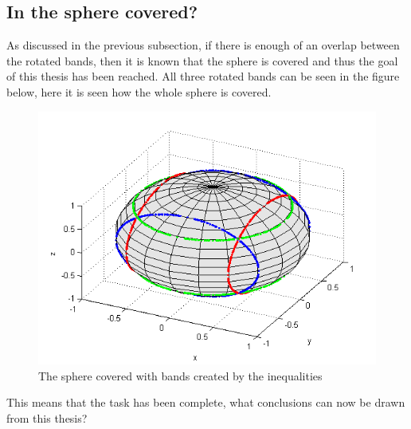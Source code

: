\subsection{In the sphere covered?}\label{Is the sphere covered?}
As discussed in the previous subsection, if there is enough of an overlap between the rotated bands, then it is known that the sphere is covered and thus the goal of this thesis has been reached.
All three rotated bands can be seen in the figure below, here it is seen how the whole sphere is covered.
\begin{figure}[H]
\begin{center}
\includegraphics[scale=0.9]{coveredsphere.png}
\caption{The sphere covered with bands created by the inequalities}
\label{fig:coveredsphere}
\end{center}
\end{figure}
This means that the task has been complete, what conclusions can now be drawn from this thesis? 